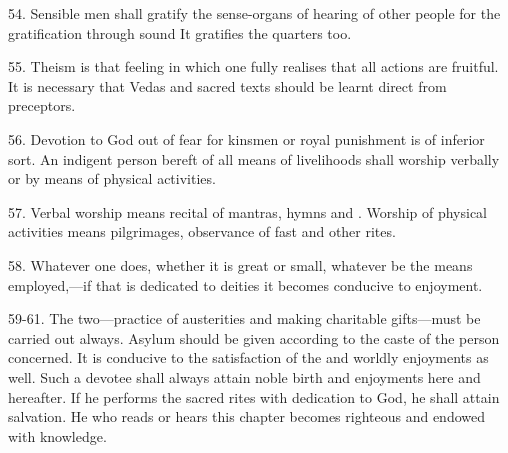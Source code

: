 54. Sensible men shall gratify the sense-organs of hearing \etc of other people
for the gratification through sound \etc It gratifies the quarters too.

55. Theism is that feeling in which one fully realises that all actions are
fruitful. It is necessary that Vedas and sacred texts should be learnt direct
from preceptors.

56. Devotion to God out of fear for kinsmen or royal punishment is of inferior
sort. An indigent person bereft of all means of livelihoods shall worship
verbally or by means of physical activities.

57. Verbal worship means recital of mantras, hymns and . Worship of
physical activities means pilgrimages, observance of fast and other rites.

58. Whatever one does, whether it is great or small, whatever be the means
employed,—if that is dedicated to deities it becomes conducive to enjoyment.

59-61. The two—practice of austerities and making charitable gifts—must be
carried out always. Asylum should be given according to the caste of the person
concerned. It is conducive to the satisfaction of the  and worldly
enjoyments as well. Such a devotee shall always attain noble birth and
enjoyments here and hereafter. If he performs the sacred rites with dedication
to God, he shall attain salvation. He who reads or hears this chapter becomes
righteous and endowed with knowledge.
